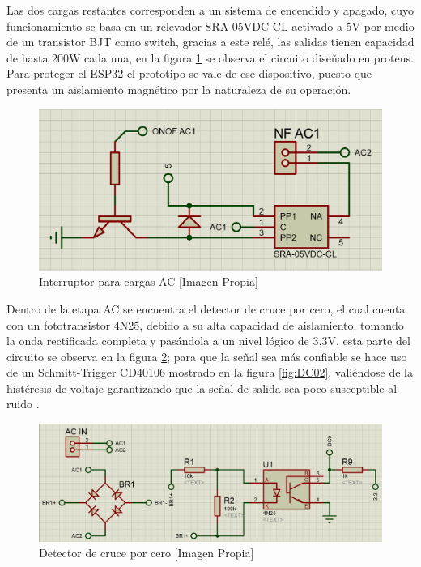 		Las dos cargas restantes corresponden a un sistema de encendido y apagado, cuyo funcionamiento se basa en un relevador SRA-05VDC-CL activado a 5V por medio de un transistor BJT como switch, gracias a este relé, las salidas tienen capacidad de hasta 200W cada una, en la figura \ref{fig:ONOFAC} se observa el circuito diseñado en proteus. Para proteger el ESP32 el prototipo se vale de ese dispositivo, puesto que presenta un aislamiento magnético por la naturaleza de su operación.\\
	
		\begin{figure}[H]
			\centering
			\caption{Interruptor para cargas AC [Imagen Propia]}
			\label{fig:ONOFAC}
			\includegraphics[width=0.7\linewidth]{Imagenes/ONOFAC}
		\end{figure}
	
		Dentro de la etapa AC se encuentra el detector de cruce por cero, el cual cuenta con un fototransistor 4N25, debido a su alta capacidad de aislamiento, tomando la onda rectificada completa y pasándola a un nivel lógico de 3.3V, esta parte del circuito se observa en la figura \ref{fig:DC01}; para que la señal sea más confiable se hace uso de un Schmitt-Trigger CD40106 mostrado en la figura \ref{fig:DC02}, valiéndose de la histéresis de voltaje garantizando que la señal de salida sea poco susceptible al ruido \cite{DC0}.\\
		
		\begin{figure}[H]
			\centering
			\caption{Detector de cruce por cero [Imagen Propia]}
			\label{fig:DC01}
			\includegraphics[width=0.85\linewidth]{Imagenes/DC01}
		\end{figure}
	
